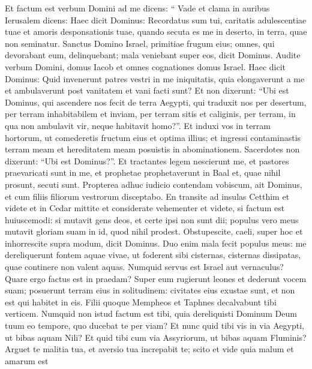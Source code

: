 \begin{biblechapter}
\begin{biblechapter}
\verse Et factum est verbum Domini ad me dicens:
 \verse “ Vade et clama in auribus Ierusalem dicens:
 Haec dicit Dominus:
 Recordatus sum tui, caritatis adulescentiae tuae
 et amoris desponsationis tuae,
 quando secuta es me in deserto,
 in terra, quae non seminatur.
 \verse Sanctus Domino Israel,
 primitiae frugum eius;
 omnes, qui devorabant eum, delinquebant;
 mala veniebant super eos,
 dicit Dominus.
 \verse Audite verbum Domini, domus Iacob
 et omnes cognationes domus Israel.
 \verse Haec dicit Dominus:
 Quid invenerunt patres vestri in me iniquitatis,
 quia elongaverunt a me
 et ambulaverunt post vanitatem
 et vani facti sunt?
 \verse Et non dixerunt: “Ubi est Dominus,
 qui ascendere nos fecit de terra Aegypti,
 qui traduxit nos per desertum,
 per terram inhabitabilem et inviam,
 per terram sitis et caliginis,
 per terram, in qua non ambulavit vir,
 neque habitavit homo?”.
 \verse Et induxi vos in terram hortorum,
 ut comederetis fructum eius et optima illius;
 et ingressi contaminastis terram meam
 et hereditatem meam posuistis in abominationem.
 \verse Sacerdotes non dixerunt:
 “Ubi est Dominus?”.
 Et tractantes legem nescierunt me,
 et pastores praevaricati sunt in me,
 et prophetae prophetaverunt in Baal
 et, quae nihil prosunt, secuti sunt.
 \verse Propterea adhuc iudicio contendam vobiscum,
 ait Dominus,
 et cum filiis filiorum vestrorum disceptabo.
 \verse En transite ad insulas Cetthim et videte
 et in Cedar mittite et considerate vehementer
 et videte, si factum est huiuscemodi:
 \verse si mutavit gens deos,
 et certe ipsi non sunt dii;
 populus vero meus mutavit gloriam suam
 in id, quod nihil prodest.
 \verse Obstupescite, caeli, super hoc
 et inhorrescite supra modum,
 dicit Dominus.
 \verse Duo enim mala fecit populus meus:
 me dereliquerunt fontem aquae vivae,
 ut foderent sibi cisternas,
 cisternas dissipatas,
 quae continere non valent aquas.
 \verse Numquid servus est Israel
 aut vernaculus?
 Quare ergo factus est in praedam?
 Super eum rugierunt leones
 \verse et dederunt vocem suam;
 posuerunt terram eius in solitudinem:
 civitates eius exustae sunt,
 et non est qui habitet in eis.
 \verse Filii quoque Mempheos et Taphnes
 decalvabunt tibi verticem.
 \verse Numquid non istud factum est tibi,
 quia dereliquisti Dominum Deum tuum
 eo tempore, quo ducebat te per viam?
 \verse Et nunc quid tibi vis in via Aegypti,
 ut bibas aquam Nili?
 Et quid tibi cum via Assyriorum,
 ut bibas aquam Fluminis?
 \verse Arguet te malitia tua,
 et aversio tua increpabit te;
 scito et vide quia malum et amarum est

\end{biblechapter}
\end{biblechapter}
